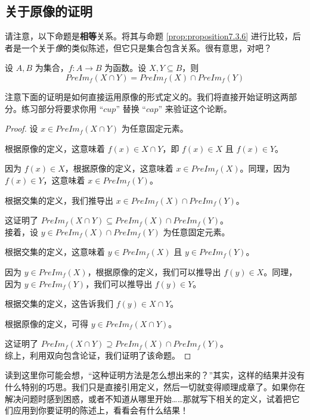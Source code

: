 
\subsection{关于原像的证明}

请注意，以下命题是\textbf{相等}关系。将其与命题 \ref{prop:proposition7.3.6} 进行比较，后者是一个关于\emph{像}的类似陈述，但它只是集合包含关系。很有意思，对吧？

\begin{proposition}
    设 $A,B$ 为集合，$f:A \to B$ 为函数。设 $X, Y \subseteq B$，则
    \[PreIm_f (X \cap Y) = PreIm_f (X) \cap PreIm_f (Y)\]
\end{proposition}

注意下面的证明是如何直接运用原像的形式定义的。我们将直接开始证明这两部分。练习部分将要求你用 ``$cup$'' 替换 ``$cap$'' 来验证这个论断。

\begin{proof}
    设 $x \in PreIm_f (X \cap Y)$ 为任意固定元素。

    根据原像的定义，这意味着 $f(x) \in X \cap Y$，即 $f(x) \in X$ 且 $f(x) \in Y$。

    因为 $f(x) \in X$，根据原像的定义，这意味着 $x \in PreIm_f (X)$。同理，因为 $f(x) \in Y$，这意味着 $x \in PreIm_f (Y)$。

    根据交集的定义，我们推导出 $x \in PreIm_f(X) \cap PreIm_f(Y)$。

    这证明了 $PreIm_f(X \cap Y) \subseteq PreIm_f(X) \cap PreIm_f(Y)$。\\

    接着，设 $y \in PreIm_f(X) \cap PreIm_f(Y)$ 为任意固定元素。

    根据交集的定义，这意味着 $y \in PreIm_f (X)$ 且 $y \in PreIm_f (Y)$。

    因为 $y \in PreIm_f (X)$，根据原像的定义，我们可以推导出 $f(y) \in X$。同理，因为 $y \in PreIm_f (Y)$，我们可以推导出 $f(y) \in Y$。

    根据交集的定义，这告诉我们 $f(y) \in X \cap Y$。

    根据原像的定义，可得 $y \in PreIm_f(X \cap Y)$。

    这证明了 $ PreIm_f(X \cap Y) \supseteq PreIm_f(X) \cap PreIm_f(Y)$。 \\

    综上，利用双向包含论证，我们证明了该命题。
\end{proof}

读到这里你可能会想，``这种证明方法是怎么想出来的？''其实，这样的结果并没有什么特别的巧思。我们只是直接引用定义，然后一切就变得顺理成章了。如果你在解决问题时感到困惑，或者不知道从哪里开始……那就写下相关的定义，试着把它们应用到你要证明的陈述上，看看会有什么结果！

